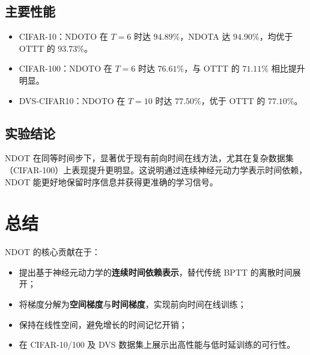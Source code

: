 \documentclass[journal,12pt,onecolumn]{IEEEtran}
\begin{document}
\subsection{主要性能}
\begin{itemize}[leftmargin=*]
  \item CIFAR-10：NDOTO 在 $T=6$ 时达 $94.89\%$，NDOTA 达 $94.90\%$，均优于 OTTT 的 $93.73\%$。
  \item CIFAR-100：NDOTO 在 $T=6$ 时达 $76.61\%$，与 OTTT 的 $71.11\%$ 相比提升明显。
  \item DVS-CIFAR10：NDOTO 在 $T=10$ 时达 $77.50\%$，优于 OTTT 的 $77.10\%$。
\end{itemize}

\subsection{实验结论}
NDOT 在同等时间步下，显著优于现有前向时间在线方法，尤其在复杂数据集（CIFAR-100）上表现提升更明显。这说明通过连续神经元动力学表示时间依赖，NDOT 能更好地保留时序信息并获得更准确的学习信号。

\section{总结}
NDOT 的核心贡献在于：
\begin{itemize}[leftmargin=*]
  \item 提出基于神经元动力学的\textbf{连续时间依赖表示}，替代传统 BPTT 的离散时间展开；
  \item 将梯度分解为\textbf{空间梯度}与\textbf{时间梯度}，实现前向时间在线训练；
  \item 保持在线性空间，避免增长的时间记忆开销；
  \item 在 CIFAR-10/100 及 DVS 数据集上展示出高性能与低时延训练的可行性。
\end{itemize}



\end{document}
